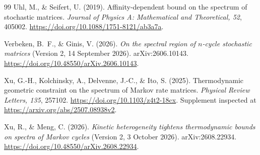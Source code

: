 \documentclass[11pt,a4paper]{article}
\numberwithin{equation}{section}
\theoremstyle{definition}
\theoremstyle{remark}
\begin{document}
\begin{thebibliography}{99}
Uhl, M., \& Seifert, U. (2019).
Affinity-dependent bound on the spectrum of stochastic matrices.
\emph{Journal of Physics A: Mathematical and Theoretical, 52}, 405002.
\url{https://doi.org/10.1088/1751-8121/ab3a7a}.

Verbeken, B.~F., \& Ginis, V. (2026).
\emph{On the spectral region of \(n\)-cycle stochastic matrices}
(Version 2, 14 September 2026). arXiv:2606.10143.
\url{https://doi.org/10.48550/arXiv.2606.10143}.

Xu, G.-H., Kolchinsky, A., Delvenne, J.-C., \& Ito, S. (2025).
Thermodynamic geometric constraint on the spectrum of Markov rate
matrices.
\emph{Physical Review Letters, 135}, 257102.
\url{https://doi.org/10.1103/z4t2-18cx}.
Supplement inspected at \url{https://arxiv.org/abs/2507.08938v2}.

Xu, R., \& Meng, C. (2026).
\emph{Kinetic heterogeneity tightens thermodynamic bounds on spectra of
Markov cycles} (Version 2, 3 October 2026). arXiv:2608.22934.
\url{https://doi.org/10.48550/arXiv.2608.22934}.

\end{thebibliography}
\end{document}
